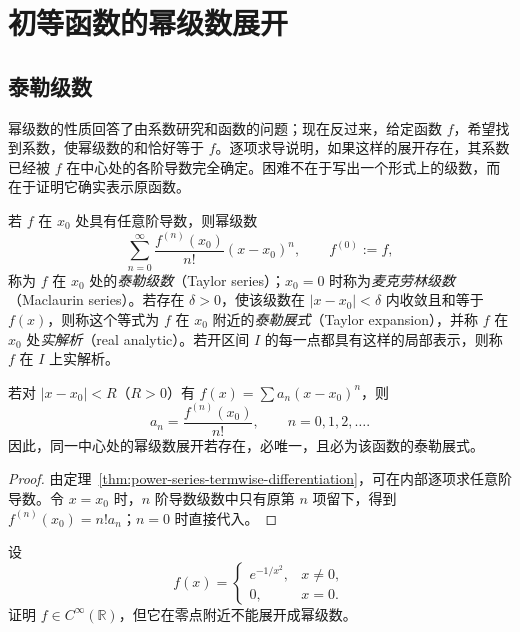 \section{初等函数的幂级数展开}
\label{sec:power-series-expansions-of-elementary-functions}

\subsection{泰勒级数}
\label{subsec:taylor-series}

幂级数的性质回答了由系数研究和函数的问题；现在反过来，给定函数 $f$，希望找到系数，使幂级数的和恰好等于 $f$。逐项求导说明，如果这样的展开存在，其系数已经被 $f$ 在中心处的各阶导数完全确定。困难不在于写出一个形式上的级数，而在于证明它确实表示原函数。

\begin{definition}
\label{def:taylor-series-and-real-analyticity}
若 $f$ 在 $x_0$ 处具有任意阶导数，则幂级数
\begin{equation}
    \sum_{n=0}^\infty\frac{f^{(n)}(x_0)}{n!}(x-x_0)^n,
    \qquad f^{(0)}:=f,
    \label{eq:taylor-series-definition}
\end{equation}
称为 $f$ 在 $x_0$ 处的\emph{泰勒级数}（Taylor series）；$x_0=0$ 时称为\emph{麦克劳林级数}（Maclaurin series）。若存在 $\delta>0$，使该级数在 $|x-x_0|<\delta$ 内收敛且和等于 $f(x)$，则称这个等式为 $f$ 在 $x_0$ 附近的\emph{泰勒展式}（Taylor expansion），并称 $f$ 在 $x_0$ 处\emph{实解析}（real analytic）。若开区间 $I$ 的每一点都具有这样的局部表示，则称 $f$ 在 $I$ 上实解析。
\end{definition}

\begin{theorem}[幂级数展开的唯一性]
\label{thm:uniqueness-of-power-series-expansion}
若对 $|x-x_0|<R$（$R>0$）有 $f(x)=\sum a_n(x-x_0)^n$，则
\begin{equation}
    a_n=\frac{f^{(n)}(x_0)}{n!},\qquad n=0,1,2,\ldots.
    \label{eq:power-series-coefficients-by-derivatives}
\end{equation}
因此，同一中心处的幂级数展开若存在，必唯一，且必为该函数的泰勒展式。
\end{theorem}

\begin{proof}
由定理~\ref{thm:power-series-termwise-differentiation}，可在内部逐项求任意阶导数。令 $x=x_0$ 时，$n$ 阶导数级数中只有原第 $n$ 项留下，得到 $f^{(n)}(x_0)=n!a_n$；$n=0$ 时直接代入。
\end{proof}

\begin{example}
\label{ex:smooth-flat-function-not-real-analytic}
设
\[
    f(x)=\begin{cases}e^{-1/x^2},&x\neq0,\\0,&x=0.\end{cases}
\]
证明 $f\in C^\infty(\mathbb R)$，但它在零点附近不能展开成幂级数。
\end{example}

